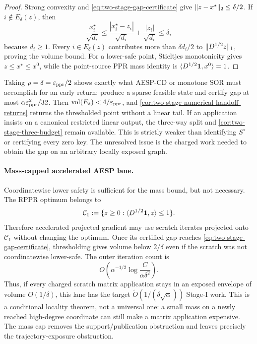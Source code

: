 \begin{proof}
Strong convexity and \cref{eq:two-stage-gap-certificate} give
$\lVert z-x^\star\rVert_2\leq\delta/2$.  If $i\notin E_\delta(z)$, then
\begin{equation*}
 \frac{x_i^\star}{\sqrt{d_i}}
 \leq\frac{|x_i^\star-z_i|}{\sqrt{d_i}}
     +\frac{|z_i|}{\sqrt{d_i}}
 \leq\delta,
\end{equation*}
because $d_i\geq1$.  Every $i\in E_\delta(z)$ contributes more than
$\delta d_i/2$ to $\lVert D^{1/2}z\rVert_1$, proving the volume bound.  For a
lower-safe point, Stieltjes monotonicity gives
$z\leq x^\star\leq x^0$, while the point-source PPR mass identity is
$\langle D^{1/2}\mathbf{1},x^0\rangle=1$.
\end{proof}

Taking $\rho=\delta=\varepsilon_{\mathrm{ppr}}/2$ shows exactly what AESP-CD or monotone
SOR must accomplish for an early return: produce a sparse feasible state and
certify gap at most $\alpha\varepsilon_{\mathrm{ppr}}^2/32$.  Then
$\operatorname{vol}(E_\delta)<4/\varepsilon_{\mathrm{ppr}}$, and
\cref{cor:two-stage-numerical-handoff-returns} returns the thresholded point
without a linear tail.  If an application insists on a canonical restricted
linear output, the three-way split and
\cref{cor:two-stage-three-budget} remain available.
This is strictly weaker than identifying $S^\star$ or certifying every zero
key.  The unresolved issue is the charged work needed to obtain the gap on an
arbitrary locally exposed graph.

\paragraph{Mass-capped accelerated AESP lane.}
Coordinatewise lower safety is sufficient for the mass bound, but not
necessary.  The RPPR optimum belongs to
\begin{equation}
 \mathcal C_1:=
 \{z\geq0:\langle D^{1/2}\mathbf{1},z\rangle\leq1\}.
 \label{eq:two-stage-mass-cap}
\end{equation}
Therefore accelerated projected gradient may use scratch iterates projected
onto $\mathcal C_1$ without changing the optimum.  Once its certified gap
reaches \cref{eq:two-stage-gap-certificate}, thresholding gives volume below
$2/\delta$ even if the scratch was not coordinatewise lower-safe.  The outer
iteration count is
\begin{equation*}
 O\!\left(\alpha^{-1/2}
   \log\frac{C}{\alpha\delta^2}\right).
\end{equation*}
Thus, if every charged scratch matrix application stays in an exposed
envelope of volume $O(1/\delta)$, this lane has the target
$\widetilde O(1/(\delta\sqrt\alpha))$ Stage-I work.  This is a conditional
locality theorem, not a universal one: a small mass on a newly reached
high-degree coordinate can still make a matrix application expensive.  The
mass cap removes the support/publication obstruction and leaves precisely the
trajectory-exposure obstruction.

